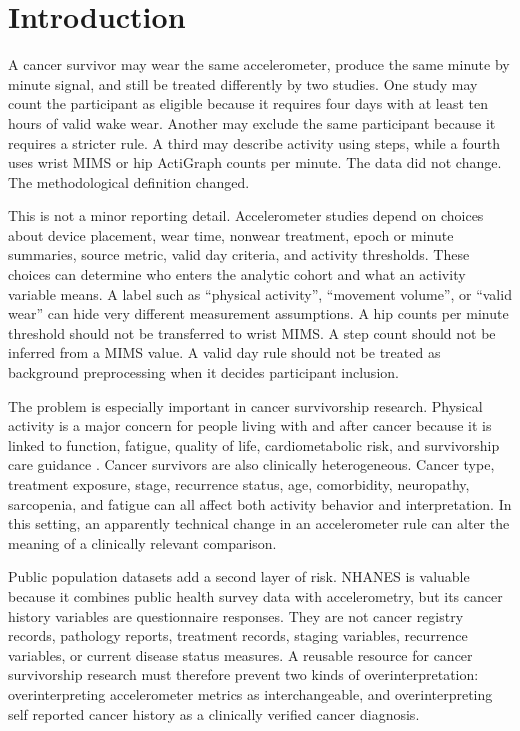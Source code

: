 \documentclass[final,5p,times,twocolumn]{elsarticle}
\begin{document}
\section{Introduction}
\label{sec:introduction}

A cancer survivor may wear the same accelerometer, produce the same minute by minute signal, and still be treated differently by two studies. One study may count the participant as eligible because it requires four days with at least ten hours of valid wake wear. Another may exclude the same participant because it requires a stricter rule. A third may describe activity using steps, while a fourth uses wrist MIMS or hip ActiGraph counts per minute. The data did not change. The methodological definition changed.

This is not a minor reporting detail. Accelerometer studies depend on choices about device placement, wear time, nonwear treatment, epoch or minute summaries, source metric, valid day criteria, and activity thresholds. These choices can determine who enters the analytic cohort and what an activity variable means. A label such as ``physical activity'', ``movement volume'', or ``valid wear'' can hide very different measurement assumptions. A hip counts per minute threshold should not be transferred to wrist MIMS. A step count should not be inferred from a MIMS value. A valid day rule should not be treated as background preprocessing when it decides participant inclusion.

The problem is especially important in cancer survivorship research. Physical activity is a major concern for people living with and after cancer because it is linked to function, fatigue, quality of life, cardiometabolic risk, and survivorship care guidance \cite{rock2022acs,schmitz2019exercise}. Cancer survivors are also clinically heterogeneous. Cancer type, treatment exposure, stage, recurrence status, age, comorbidity, neuropathy, sarcopenia, and fatigue can all affect both activity behavior and interpretation. In this setting, an apparently technical change in an accelerometer rule can alter the meaning of a clinically relevant comparison.

Public population datasets add a second layer of risk. NHANES is valuable because it combines public health survey data with accelerometry, but its cancer history variables are questionnaire responses. They are not cancer registry records, pathology reports, treatment records, staging variables, recurrence variables, or current disease status measures. A reusable resource for cancer survivorship research must therefore prevent two kinds of overinterpretation: overinterpreting accelerometer metrics as interchangeable, and overinterpreting self reported cancer history as a clinically verified cancer diagnosis.
\end{document}
